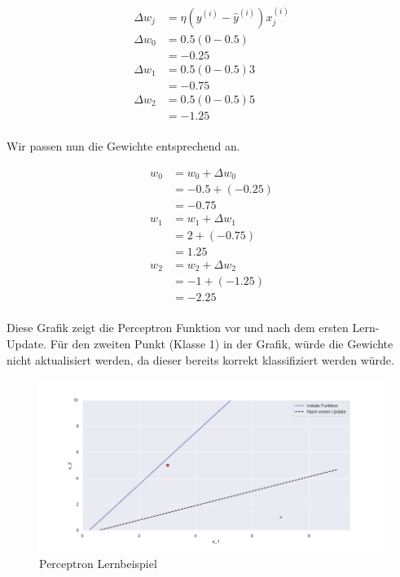 \begin{flushleft}
\begin{align*}
\Delta w_{j} &= \eta (y^{(i)} - \hat{y}^{(i)}) x_{j}^{(i)} \\
\Delta w_{0} &= 0.5(0-0.5) \\
			 &= -0.25 \\
\Delta w_{1} &= 0.5(0-0.5)3 \\
			 &= -0.75 \\
\Delta w_{2} &= 0.5(0-0.5)5 \\
			 &= -1.25\\
\end{align*}

Wir passen nun die Gewichte entsprechend an.

\begin{align*}
	 w_{0} &= w_{0} + \Delta w_{0}\\
	 	   &= -0.5 + (-0.25) \\
	 	   &= -0.75 \\
	 w_{1} &= w_{1} + \Delta w_{1} \\
	 	   &= 2 + (-0.75) \\
	 	   &= 1.25 \\
	 w_{2} &= w_{2} + \Delta w_{2} \\
	 	   &= -1 + (-1.25) \\
	 	   &= -2.25 \\
\end{align*}

Diese Grafik zeigt die Perceptron Funktion vor und nach dem ersten Lern-Update. Für den zweiten Punkt (Klasse 1) in der Grafik, würde die Gewichte nicht aktualisiert werden, da dieser bereits korrekt klassifiziert werden würde.


\begin{figure}[H]
	\centering
	\label{fig:perceptron_learning}
	\includegraphics[scale=0.6]{figures/perceptron_learning}
	\caption{Perceptron Lernbeispiel}
\end{figure}





\end{flushleft}
